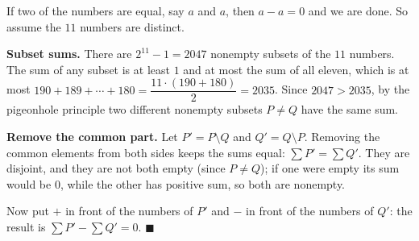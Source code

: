 If two of the numbers are equal, say $a$ and $a$, then $a-a=0$ and we are done. So assume the $11$ numbers are distinct.

\textbf{Subset sums.} There are $2^{11}-1=2047$ nonempty subsets of the $11$ numbers. The sum of any subset is at least $1$ and at most the sum of all eleven, which is at most $190+189+\cdots+180=\dfrac{11\cdot(190+180)}{2}=2035$. Since $2047>2035$, by the pigeonhole principle two different nonempty subsets $P\ne Q$ have the same sum.

\textbf{Remove the common part.} Let $P'=P\setminus Q$ and $Q'=Q\setminus P$. Removing the common elements from both sides keeps the sums equal: $\sum P'=\sum Q'$. They are disjoint, and they are not both empty (since $P\ne Q$); if one were empty its sum would be $0$, while the other has positive sum, so both are nonempty.

Now put $+$ in front of the numbers of $P'$ and $-$ in front of the numbers of $Q'$: the result is $\sum P'-\sum Q'=0$. $\blacksquare$
